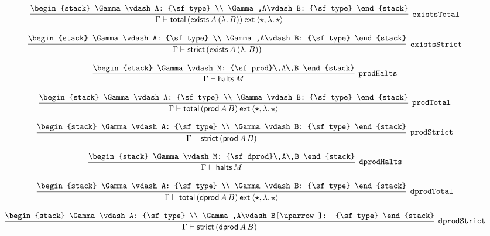 \[
\infer[{\tt existsTotal}]{\Gamma \vdash {\sf total}\,({\sf exists}\,A\,(\lambda .\,B))\:{\sf ext}\:\langle \star ,\lambda .\,\star \rangle }{
\begin{stack}
\Gamma \vdash A: {\sf type}
\\
\Gamma ,A\vdash B: {\sf type}
\end{stack}}
\]

\[
\infer[{\tt existsStrict}]{\Gamma \vdash {\sf strict}\,({\sf exists}\,A\,(\lambda .\,B))}{
\begin{stack}
\Gamma \vdash A: {\sf type}
\\
\Gamma ,A\vdash B: {\sf type}
\end{stack}}
\]

\[
\infer[{\tt prodHalts}]{\Gamma \vdash {\sf halts}\,M}{
\begin{stack}
\Gamma \vdash M: {\sf prod}\,A\,B
\end{stack}}
\]

\[
\infer[{\tt prodTotal}]{\Gamma \vdash {\sf total}\,({\sf prod}\,A\,B)\:{\sf ext}\:\langle \star ,\lambda .\,\star \rangle }{
\begin{stack}
\Gamma \vdash A: {\sf type}
\\
\Gamma \vdash B: {\sf type}
\end{stack}}
\]

\[
\infer[{\tt prodStrict}]{\Gamma \vdash {\sf strict}\,({\sf prod}\,A\,B)}{
\begin{stack}
\Gamma \vdash A: {\sf type}
\\
\Gamma \vdash B: {\sf type}
\end{stack}}
\]

\[
\infer[{\tt dprodHalts}]{\Gamma \vdash {\sf halts}\,M}{
\begin{stack}
\Gamma \vdash M: {\sf dprod}\,A\,B
\end{stack}}
\]

\[
\infer[{\tt dprodTotal}]{\Gamma \vdash {\sf total}\,({\sf dprod}\,A\,B)\:{\sf ext}\:\langle \star ,\lambda .\,\star \rangle }{
\begin{stack}
\Gamma \vdash A: {\sf type}
\\
\Gamma \vdash B: {\sf type}
\end{stack}}
\]

\[
\infer[{\tt dprodStrict}]{\Gamma \vdash {\sf strict}\,({\sf dprod}\,A\,B)}{
\begin{stack}
\Gamma \vdash A: {\sf type}
\\
\Gamma ,A\vdash B[\uparrow ]: {\sf type}
\end{stack}}
\]

